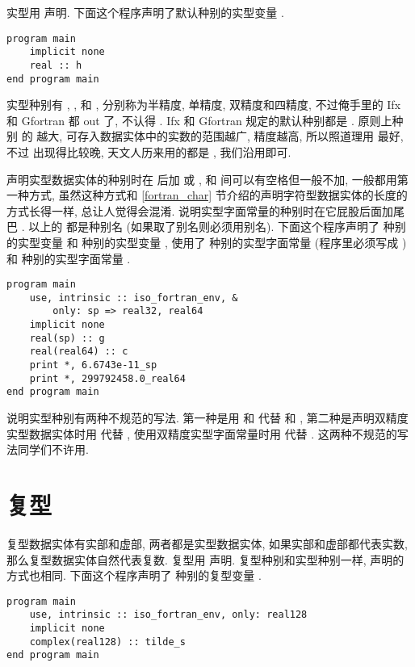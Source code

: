 实型用  声明. 下面这个程序声明了默认种别的实型变量 .
\begin{lstlisting}
program main
    implicit none
    real :: h
end program main
\end{lstlisting}

实型种别有 , ,  和 , 分别称为半精度, 单精度, 双精度和四精度, 不过俺手里的 Ifx 和 Gfortran 都 out 了, 不认得 . Ifx 和 Gfortran 规定的默认种别都是 . 原则上种别  的  越大, 可存入数据实体中的实数的范围越广, 精度越高, 所以照道理用  最好, 不过  出现得比较晚, 天文人历来用的都是 , 我们沿用即可.

声明实型数据实体的种别时在  后加 \ttt{([kind])} 或 , 和  间可以有空格但一般不加, 一般都用第一种方式, 虽然这种方式和 \ref{fortran_char} 节介绍的声明字符型数据实体的长度的方式长得一样, 总让人觉得会混淆. 说明实型字面常量的种别时在它屁股后面加尾巴 \ttt{\_{}[kind]}. 以上的 \ttt{[kind]} 都是种别名 (如果取了别名则必须用别名). 下面这个程序声明了  种别的实型变量  和  种别的实型变量 , 使用了  种别的实型字面常量  (程序里必须写成 ) 和  种别的实型字面常量 .
\begin{lstlisting}
program main
    use, intrinsic :: iso_fortran_env, &
        only: sp => real32, real64
    implicit none
    real(sp) :: g
    real(real64) :: c
    print *, 6.6743e-11_sp
    print *, 299792458.0_real64
end program main
\end{lstlisting}

说明实型种别有两种不规范的写法. 第一种是用  和  代替  和 , 第二种是声明双精度实型数据实体时用  代替 , 使用双精度实型字面常量时用  代替 . 这两种不规范的写法同学们不许用.

\section{复型}\label{fortran_complex}

复型数据实体有实部和虚部, 两者都是实型数据实体, 如果实部和虚部都代表实数, 那么复型数据实体自然代表复数. 复型用  声明. 复型种别和实型种别一样, 声明的方式也相同. 下面这个程序声明了  种别的复型变量 .
\begin{lstlisting}
program main
    use, intrinsic :: iso_fortran_env, only: real128
    implicit none
    complex(real128) :: tilde_s
end program main
\end{lstlisting}

